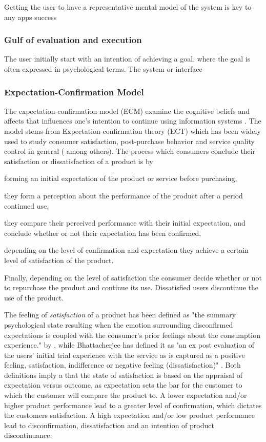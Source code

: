 Getting the user to have a representative mental model of the system is key to any apps success

\subsubsection{Gulf of evaluation and execution}
The user initially start with an intention of achieving a goal, where the goal is often expressed in psychological terms. The system or interface

\subsubsection{Expectation-Confirmation Model}
The expectation-confirmation model (ECM) examine the cognitive beliefs and affects that influences one's intention to continue using information systems \cite{Bhattacherjee2001a}. The model stems from Expectation-confirmation theory (ECT) which has been widely used to study consumer satisfaction, post-purchase behavior and service quality control in general (\cite{Anderson1993} \cite{Oliver1981} among others). The process which consumers conclude their satisfaction or dissatisfaction of a product is by \begin{enumerate*}[label=(\(\arabic*\))]
  \item forming an initial expectation of the product or service before purchasing,
  \item they form a perception about the performance of the product after a period continued use,
  \item they compare their perceived performance with their initial expectation, and conclude whether or not their expectation has been confirmed,
  \item depending on the level of confirmation and expectation they achieve a certain level of satisfaction of the product.
  \item Finally, depending on the level of satisfaction the consumer decide whether or not to repurchase the product and continue its use. Dissatisfied users discontinue the use of the product.
\end{enumerate*}

The feeling of \textit{satisfaction} of a product has been defined as "the summary psychological state resulting when the emotion surrounding disconfirmed expectations is coupled with the consumer's prior feelings about the consumption experience." by \cite{Oliver1981}, while Bhattacherjee has defined it as "an ex post evaluation of the users’ initial trial experience with the service as is captured as a positive feeling, satisfaction, indifference or negative feeling (dissatisfaction)" \cite{Bhattacherjee2001}. Both definitions imply a that the state of satisfaction is based on the appraisal of expectation versus outcome, as expectation sets the bar for the customer to which the customer will compare the product to. A lower expectation and/or higher product performance lead to a greater level of confirmation, which dictates the customers satisfaction. A high expectation and/or low product performance lead to disconfirmation, dissatisfaction and an intention of product discontinuance.

